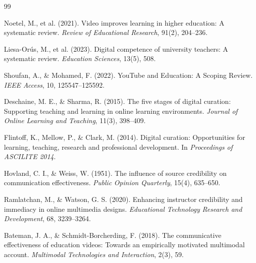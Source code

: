 
\begin{thebibliography}{99}

Noetel, M., et al. (2021).
Video improves learning in higher education: A systematic review.
\textit{Review of Educational Research}, 91(2), 204--236.

Liesa-Orús, M., et al. (2023).
Digital competence of university teachers: A systematic review.
\textit{Education Sciences}, 13(5), 508.

Shoufan, A., \& Mohamed, F. (2022).
YouTube and Education: A Scoping Review.
\textit{IEEE Access}, 10, 125547--125592.

Deschaine, M. E., \& Sharma, R. (2015).
The five stages of digital curation: Supporting teaching and learning in online learning environments.
\textit{Journal of Online Learning and Teaching}, 11(3), 398--409.

Flintoff, K., Mellow, P., \& Clark, M. (2014).
Digital curation: Opportunities for learning, teaching, research and professional development.
In \textit{Proceedings of ASCILITE 2014}.

Hovland, C. I., \& Weiss, W. (1951).
The influence of source credibility on communication effectiveness.
\textit{Public Opinion Quarterly}, 15(4), 635--650.

Ramlatchan, M., \& Watson, G. S. (2020).
Enhancing instructor credibility and immediacy in online multimedia designs.
\textit{Educational Technology Research and Development}, 68, 3239--3264.

Bateman, J. A., \& Schmidt-Borcherding, F. (2018).
The communicative effectiveness of education videos:
Towards an empirically motivated multimodal account.
\textit{Multimodal Technologies and Interaction}, 2(3), 59.

\end{thebibliography}